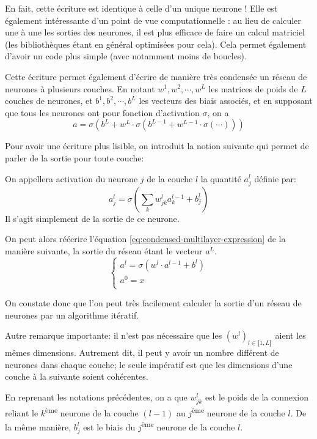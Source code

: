 En fait, cette écriture est identique à celle d'un unique neurone !
Elle est également intéressante d'un point de vue computationnelle : au lieu 
de calculer une à une les sorties des neurones, il est plus efficace de faire 
un calcul matriciel (les bibliothèques étant en général optimisées pour cela).
Cela permet également d'avoir un code plus simple (avec notamment moins de boucles).

Cette écriture permet également d'écrire de manière très condensée un réseau 
de neurones à plusieurs couches. 
En notant $w^{1}, w^{2}, \cdots, w^{L}$ les matrices de poids de $L$ couches de 
neurones, et $b^{1}, b^{2}, \cdots, b^{L}$ les vecteurs des biais associés, et 
en supposant que tous les neurones ont pour fonction d'activation $\sigma$, on a
\begin{equation}
\label{eq:condensed-multilayer-expression}
a = \sigma(b^{L} + w^{L} \cdot \sigma(b^{L-1} + w^{L-1} \cdot \sigma(\cdots)))
\end{equation}

Pour avoir une écriture plus lisible, on introduit la notion suivante qui 
permet de parler de la sortie pour toute couche:
\begin{definition}
On appellera activation du neurone $j$ de la couche $l$ la quantité $a_{j}^{l}$ 
définie par:
\[
a_{j}^{l} = \sigma \left( \sum_{k} w_{jk}^{l} a_{k}^{l-1} + b_{j}^{l} \right)
\]
Il s'agit simplement de la sortie de ce neurone.
\end{definition}

On peut alors réécrire l'équation \ref{eq:condensed-multilayer-expression} de la 
manière suivante, la sortie du réseau étant le vecteur $a^{L}$.
\[
\begin{cases}
 a^{l} = \sigma(w^{l} \cdot a^{l-1} + b^{l}) \\
 a^{0} = x \\
\end{cases}
\]

On constate donc que l'on peut très facilement calculer la sortie d'un réseau 
de neurones par un algorithme itératif. 

Autre remarque importante: il n'est pas nécessaire que les $(w^{l})_{l \in \llbracket 1, L \rrbracket}$ 
aient les mêmes dimensions. Autrement dit, il peut y avoir un nombre différent 
de neurones dans chaque couche; le seule impératif est que les dimensions 
d'une couche à la suivante soient cohérentes.

En reprenant les notations précédentes, on a que $w_{jk}^{l}$ est le poids de la 
connexion reliant le $k$\textsuperscript{ème} neurone de la couche $(l-1)$ au 
$j$\textsuperscript{ème} neurone de la couche $l$.
De la même manière, $b_{j}^{l}$ est le biais du $j$\textsuperscript{ème} neurone 
de la couche $l$.



